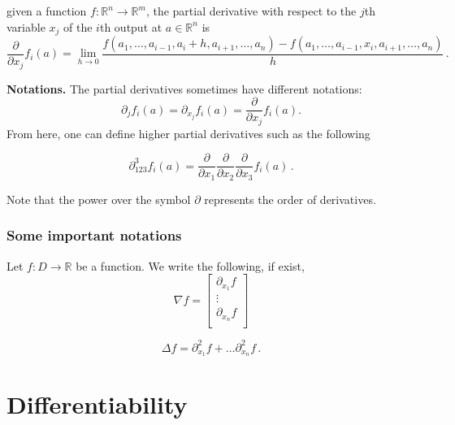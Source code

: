 \documentclass[
]{book}
\theoremstyle{definition}
\theoremstyle{definition}
\theoremstyle{definition}
\theoremstyle{definition}
\theoremstyle{remark}
\begin{document}
given a function \(f:\mathbb{R}^n \to \mathbb{R}^m\), the partial derivative with respect to the \(j\)th variable \(x_j\)
of the \(i\)th output at \(a \in \mathbb{R}^n\) is
\begin{equation*}
    \frac{ \partial }{\partial x_j} f_{i}(a) 
    = \lim_{h\to 0} \frac{ f(a_1, \dots, a_{i-1}, a_i + h , a_{i+1}, \dots, a_n) - f(a_1, \dots, a_{i-1}, x_i  , a_{i+1}, \dots, a_n)}{h} \,.
\end{equation*}

\textbf{Notations.}
The partial derivatives sometimes have different notations:
\begin{equation*}
   \partial_j f_i (a) =  
   \partial_{x_j} f_i (a) =  
    \frac{ \partial }{\partial x_j} f_{i}(a) .
\end{equation*}
From here, one can define higher partial derivatives such as the following

\begin{equation*}
    \partial^3_{1 2 3}  f_i (a) = \frac{\partial}{\partial x_1} \frac{\partial}{\partial x_2} \frac{\partial}{\partial x_3} f_i (a)\,.
\end{equation*}

Note that the power over the symbol \(\partial\) represents the order of derivatives.

\subsubsection*{Some important notations}\label{some-important-notations}


Let \(f:D \to \mathbb{R}\) be a function. We write the following, if exist,
\begin{equation*}
    \nabla f = \begin{bmatrix}
        \partial_{x_1} f\\
        \vdots \\
        \partial_{x_n} f\\
    \end{bmatrix}
\end{equation*}

\begin{equation*}
    \Delta f = \partial_{x_1}^2 f + \dots \partial_{x_n}^2 f \,.
\end{equation*}

\section{Differentiability}\label{differentiability}
\end{document}
